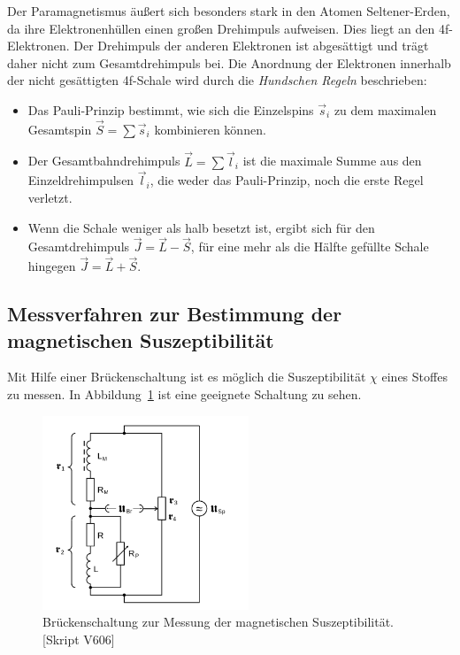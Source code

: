 Der Paramagnetismus äußert sich besonders stark in den Atomen Seltener-Erden, da ihre Elektronenhüllen einen großen Drehimpuls aufweisen. Dies liegt an den 4f-Elektronen. Der Drehimpuls der anderen Elektronen ist abgesättigt und trägt daher nicht zum Gesamtdrehimpuls bei. Die Anordnung der Elektronen innerhalb der nicht gesättigten 4f-Schale wird durch die \emph{Hundschen Regeln} beschrieben:
\begin{itemize}
  \item Das Pauli-Prinzip bestimmt, wie sich die Einzelspins $\vec s_i$ zu dem maximalen Gesamtspin $\vec S = \sum{\vec s_i}$ kombinieren können.
  \item Der Gesamtbahndrehimpuls $\vec L = \sum{\vec l_i}$ ist die maximale Summe aus den Einzeldrehimpulsen $\vec l_i$, die weder das Pauli-Prinzip, noch die erste Regel verletzt.
  \item Wenn die Schale weniger als halb besetzt ist, ergibt sich für den Gesamtdrehimpuls $\vec J = \vec L - \vec S$, für eine mehr als die Hälfte gefüllte Schale hingegen $\vec J = \vec L + \vec S$.
\end{itemize}

\subsection{Messverfahren zur Bestimmung der magnetischen Suszeptibilität}\label{sec:messung}

Mit Hilfe einer Brückenschaltung ist es möglich die Suszeptibilität $\chi$ eines Stoffes zu messen. In Abbildung~\ref{fig:bruecke} ist eine geeignete Schaltung zu sehen.

\begin{figure}[H]
 \centering
 \includegraphics[width=0.55\textwidth]{../figures/bruecke.png}
 \caption{Brückenschaltung zur Messung der magnetischen Suszeptibilität.[Skript V606]}
 \label{fig:bruecke}
\end{figure}

